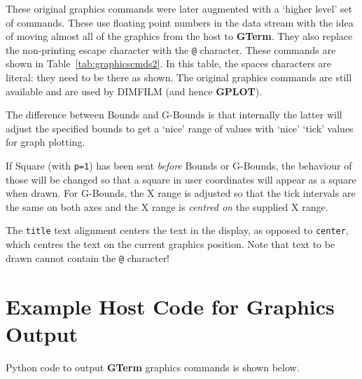 \documentclass[a4paper,twoside,11pt]{article}
\newcommand{\newpara}{\par\vspace{4mm}\noindent}
\begin{document}
\newpara
These original graphics commands were later augmented with a `higher level' set of
commands. These use floating point numbers in the data stream with the idea of moving almost all
of the graphics from the host to \textbf{GTerm}.  They also replace the non-printing escape
character with the \texttt{@} character. These commands are shown in Table~\ref{tab:graphicscmds2}.
In this table, the spaces characters are literal: they need to be there as shown. The original graphics 
commands are still available and are used by DIMFILM (and hence \textbf{GPLOT}).

\newpara
The difference between Bounds and G-Bounds  is that internally the latter will adjust the specified bounds
to get  a `nice' range of values with `nice' `tick' values for graph plotting.

\newpara
If Square (with \texttt{p=1}) has been sent \emph{before} Bounds or G-Bounds, the behaviour of those
will be changed so that a square in user coordinates will appear as a square when drawn. For G-Bounds, 
the X range is adjusted so that the tick intervals are the same on both
axes and the X range is \emph{centred on} the supplied X range.

\newpara
The \texttt{title} text alignment centers the text in the display, as opposed to \texttt{center}, which centres
the text on the current graphics position. Note that text to be drawn cannot contain the \texttt{@} character!

\section{Example Host Code for Graphics Output}
Python code to output \textbf{GTerm} graphics commands is shown below.
\end{document}
